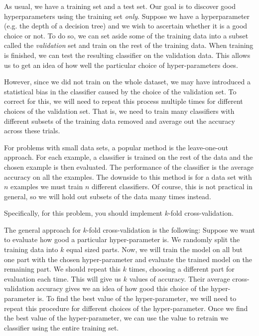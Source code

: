 As usual, we have a training set and a test set. Our goal is to discover good
hyperparameters using the training set \emph{only}. Suppose we have a
hyperparameter (e.g. the depth of a decision tree) and we wish to ascertain
whether it is a good choice or not. To do so, we can set aside some of the
training data into a subset called the {\em validation} set and train on the
rest of the training data. When training is finished, we can test the resulting
classifier on the validation data. This allows us to get an idea of how well the
particular choice of hyper-parameters does.

However, since we did not train on the whole dataset, we may have introduced a
statistical bias in the classifier caused by the choice of the validation
set. To correct for this, we will need to repeat this process multiple times for
different choices of the validation set. That is, we need to train many classifiers
with different subsets of the training data removed and average out the accuracy
across these trials.

For problems with small data sets, a popular method is the leave-one-out
approach. For each example, a classifier is trained on the rest of the data and
the chosen example is then evaluated. The performance of the classifier is the
average accuracy on all the examples.  The downside to this method is for a data
set with $n$ examples we must train $n$ different classifiers. Of course, this
is not practical in general, so we will hold out subsets of the data many times
instead.

Specifically, for this problem, you should implement $k$-fold cross-validation.

The general approach for $k$-fold cross-validation is the following: Suppose we
want to evaluate how good a particular hyper-parameter is. We randomly split the
training data into $k$ equal sized parts. Now, we will train the model on all
but one part with the chosen hyper-parameter and evaluate the trained model on
the remaining part. We should repeat this $k$ times, choosing a different part
for evaluation each time. This will give us $k$ values of accuracy. Their
average cross-validation accuracy gives we an idea of how good this choice of
the hyper-parameter is. To find the best value of the hyper-parameter, we will
need to repeat this procedure for different choices of the hyper-parameter. Once
we find the best value of the hyper-parameter, we can use the value to retrain
we classifier using the entire training set.
\\


